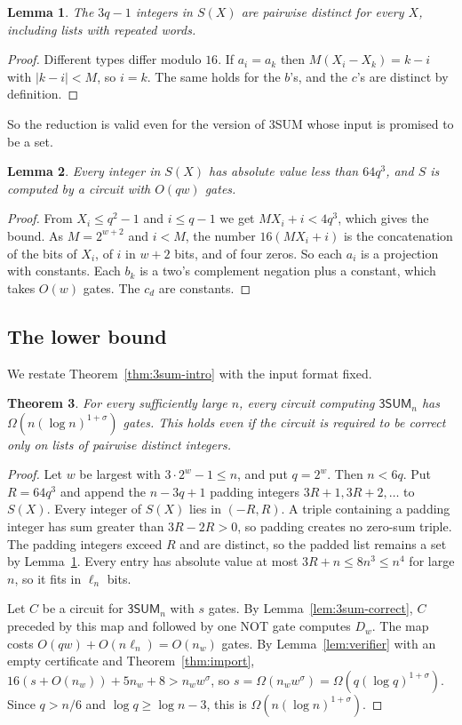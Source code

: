 \documentclass[11pt]{article}
\newtheorem{theorem}{Theorem}[section]
\newtheorem{lemma}[theorem]{Lemma}
\theoremstyle{definition}
\theoremstyle{remark}
\newcommand{\TSUM}{\mathsf{3SUM}}
\begin{document}
\begin{lemma}\label{lem:3sum-distinct}
The $3q-1$ integers in $S(X)$ are pairwise distinct for every $X$,
including lists with repeated words.
\end{lemma}
\begin{proof}
Different types differ modulo $16$. If $a_i=a_k$ then $M(X_i-X_k)=k-i$
with $|k-i|<M$, so $i=k$. The same holds for the $b$'s, and the $c$'s are
distinct by definition.
\end{proof}

So the reduction is valid even for the version of 3SUM whose input is
promised to be a set.

\begin{lemma}\label{lem:3sum-cost}
Every integer in $S(X)$ has absolute value less than $64q^3$, and $S$ is
computed by a circuit with $O(qw)$ gates.
\end{lemma}
\begin{proof}
From $X_i\le q^2-1$ and $i\le q-1$ we get $MX_i+i<4q^3$, which gives the
bound. As $M=2^{w+2}$ and $i<M$, the number $16(MX_i+i)$ is the
concatenation of the bits of $X_i$, of $i$ in $w+2$ bits, and of four
zeros. So each $a_i$ is a projection with constants. Each $b_k$ is a
two's complement negation plus a constant, which takes $O(w)$ gates.
The $c_d$ are constants.
\end{proof}

\subsection{The lower bound}
We restate Theorem~\ref{thm:3sum-intro} with the input format fixed.

\begin{theorem}\label{thm:3sum}
For every sufficiently large $n$, every circuit computing $\TSUM_n$ has
$\Omega(n(\log n)^{1+\sigma})$ gates. This holds even if the circuit is
required to be correct only on lists of pairwise distinct integers.
\end{theorem}
\begin{proof}
Let $w$ be largest with $3\cdot2^w-1\le n$, and put $q=2^w$. Then
$n<6q$. Put $R=64q^3$ and append the $n-3q+1$ padding integers
$3R+1,3R+2,\dots$ to $S(X)$. Every integer of $S(X)$ lies in $(-R,R)$. A
triple containing a padding integer has sum greater than $3R-2R>0$, so
padding creates no zero-sum triple. The padding integers exceed $R$ and
are distinct, so the padded list remains a set by
Lemma~\ref{lem:3sum-distinct}. Every entry has absolute value at most
$3R+n\le 8n^3\le n^4$ for large $n$, so it fits in $\ell_n$ bits.

Let $C$ be a circuit for $\TSUM_n$ with $s$ gates. By
Lemma~\ref{lem:3sum-correct}, $C$ preceded by this map and followed by one
NOT gate computes $D_w$. The map costs $O(qw)+O(n\ell_n)=O(n_w)$ gates.
By Lemma~\ref{lem:verifier} with an empty certificate and
Theorem~\ref{thm:import}, $16(s+O(n_w))+5n_w+8>n_ww^\sigma$, so
$s=\Omega(n_ww^\sigma)=\Omega(q(\log q)^{1+\sigma})$. Since $q>n/6$ and
$\log q\ge\log n-3$, this is $\Omega(n(\log n)^{1+\sigma})$.
\end{proof}
\end{document}

